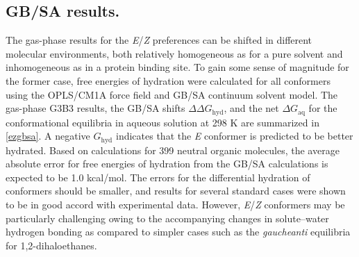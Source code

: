 \documentclass[12pt]{report}
\begin{document}
\subsection{GB/SA results.}

The gas-phase results for the \textit{E}/\textit{Z} preferences can be shifted in different molecular environments, both relatively homogeneous as for a pure solvent and inhomogeneous as in a protein binding site. To gain some sense of magnitude for the former case, free energies of hydration were calculated for all conformers using the OPLS/CM1A force field and GB/SA continuum solvent model. \cite{jorg2004,jjez} The gas-phase G3B3 results, the GB/SA shifts $\Delta\Delta G_{\textrm{hyd}}$, and the net $\Delta G_{\textrm{aq}}$ for the conformational equilibria in aqueous solution at 298 K are summarized in \cref{ezgbsa}. A negative $G_{\textrm{hyd}}$ indicates that the \textit{E} conformer is predicted to be better hydrated. Based on calculations for 399 neutral organic molecules, the average absolute error for free energies of hydration from the GB/SA calculations is expected to be 1.0 kcal/mol.\cite{bashford} The errors for the differential hydration of conformers should be smaller, and results for several standard cases were shown to be in good accord with experimental data.\cite{bashford} However, \textit{E}/\textit{Z} conformers may be particularly challenging owing to the accompanying changes in solute--water hydrogen bonding as compared to simpler cases such as the \textit{gauche}\ce{<=>}\textit{anti} equilibria for 1,2-dihaloethanes.\cite{bashford}
\end{document}
